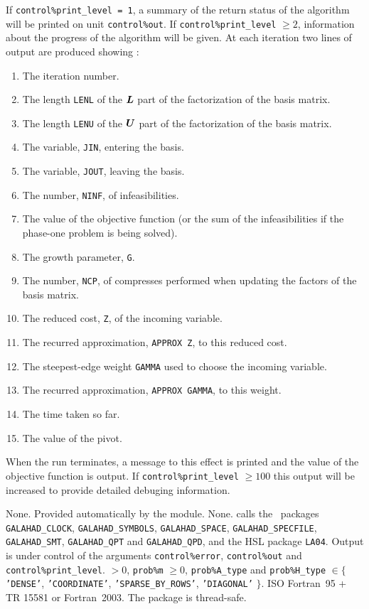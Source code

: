 \documentclass{galahad}
\newcommand{\packagename}{LPA}
\begin{document}
\galinfo
If {\tt control\%print\_level = 1}, a summary of the return status
of the algorithm will be printed on unit {\tt control\-\%out}.
If {\tt control\%print\_level} $\geq 2$, information about the progress
of the algorithm will be given.
At each iteration two lines of output are produced showing :
\begin{enumerate}
\item[(i)] The iteration number.
\item[(ii)] The length {\tt LENL} of the ${\bm{L}}$ part of the factorization of
the basis matrix.
\item[(iii)] The length {\tt LENU} of the ${\bm{U}}$ part of the factorization of
the basis matrix.
\item[(iv)] The variable, {\tt JIN}, entering the basis.
\item[(v)] The variable, {\tt JOUT}, leaving the basis.
\item[(vi)] The number, {\tt NINF}, of infeasibilities.
\item[(vii)] The value of the objective function (or the sum
of the infeasibilities if the phase-one problem is being solved).
\item[(viii)] The growth parameter, {\tt G}.
\item[(ix)] The number, {\tt NCP}, of compresses performed when updating the factors of the
  basis matrix.
\item[(x)] The reduced cost, {\tt Z}, of the incoming variable.
\item[(xi)] The recurred approximation, {\tt APPROX Z},  to this reduced cost.
\item[(xii)] The steepest-edge weight {\tt GAMMA} used to choose the incoming
variable.
\item[(xiii)] The recurred approximation, {\tt APPROX GAMMA}, to this weight.
\item[(xiv)] The time taken so far.
\item[(xv)] The value of the pivot.
\end{enumerate}
When the run terminates, a message to this effect is printed and
the value of the objective function is output.
If {\tt control\%print\_level} $\geq 100$ this
output will be increased to provide detailed debuging information.


\galgeneral

\galcommon None.
\galworkspace Provided automatically by the module.
\galroutines None.
\galmodules {\tt \packagename\_solve} calls the \galahad\ packages
{\tt GALAHAD\_CLOCK},
{\tt GALAHAD\_SY\-M\-BOLS},
{\tt GALA\-HAD\_SPACE},
{\tt GALAHAD\_SPECFILE},
{\tt GALAHAD\_SMT},
{\tt GALAHAD\_QPT}
and
{\tt GALAHAD\_QPD},
and the HSL package {\tt LA04}.
\galio Output is under control of the arguments
 {\tt control\%error}, {\tt control\%out} and {\tt control\%print\_level}.
 $> 0$, {\tt prob\%m} $\geq  0$,
{\tt prob\%A\_type} and {\tt prob\%H\_type} $\in \{${\tt 'DENSE'},
 {\tt 'COORDINATE'}, {\tt 'SPARSE\_BY\_\-ROWS'}, {\tt 'DIAGONAL'} $\}$.
\galportability ISO Fortran~95 + TR 15581 or Fortran~2003.
The package is thread-safe.
\end{document}
